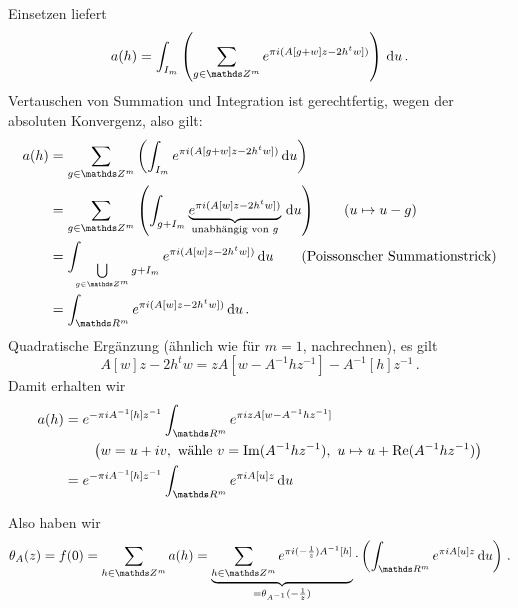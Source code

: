 \begin{bewe}
Einsetzen liefert
\[
    a(h)
    = \int_{I_m} \left(\sum_{g\in\ZZ^m} e^{\pi i(A[g+w]z-2h^tw])}\right) \opd u
    \,.
\]
Vertauschen von Summation und Integration ist gerechtfertig, wegen der absoluten Konvergenz, also gilt:
\begin{align*}
    a(h)
    &= \sum_{g\in\ZZ^m} \left(\int_{I_m} e^{\pi i(A[g+w]z-2h^tw])} \opd u\right) \\
    &= \sum_{g\in\ZZ^m} \left(\int_{g+I_m} \underbrace{e^{\pi i(A[w]z-2h^tw])}}_{\text{unabhängig von $g$}} \opd u\right) \qquad (u \mapsto u-g) \\
    &= \int_{\bigcup\limits_{g\in\ZZ^m} g+I_m} e^{\pi i(A[w]z-2h^tw])} \opd u
        \qquad (\text{Poissonscher Summationstrick}) \\
    &= \int_{\RR^m}  e^{\pi i(A[w]z-2h^tw])} \opd u
    \,.
\end{align*}
Quadratische Ergänzung (ähnlich wie für $m=1$, nachrechnen), es gilt
\[
    A[w]z - 2h^tw
    = zA[w - A^{-1}hz^{-1}]-A^{-1}[h]z^{-1}
    \,.
\]
Damit erhalten wir
\begin{align*}
    a(h)
    &= e^{-\pi iA^{-1}[h]z^{-1}} \int_{\RR^m} e^{\pi i z A[w-A^{-1}hz^{-1}]} \\
    &\qquad \left( w = u+iv, \text{ wähle } v = \Im(A^{-1}hz^{-1}),\ u\mapsto u + \Re(A^{-1}hz^{-1}) \right) \\
    &= e^{-\pi iA^{-1}[h]z^{-1}} \int_{\RR^m} e^{\pi iA[u]z} \opd u
\end{align*}

Also haben wir
\[
    \theta_A(z)
    = f(0)
    = \sum_{h\in\ZZ^m} a(h)
    = \underbrace{\sum_{h\in\ZZ^m} e^{\pi i(-\frac{1}{z})A^{-1}[h]}}_{=\theta_{A^{-1}}(-\frac{1}{z})} \cdot \left( \int_{\RR^m} e^{\pi iA[u]z} \opd u \right)
    \,.
\]


\end{bewe}

